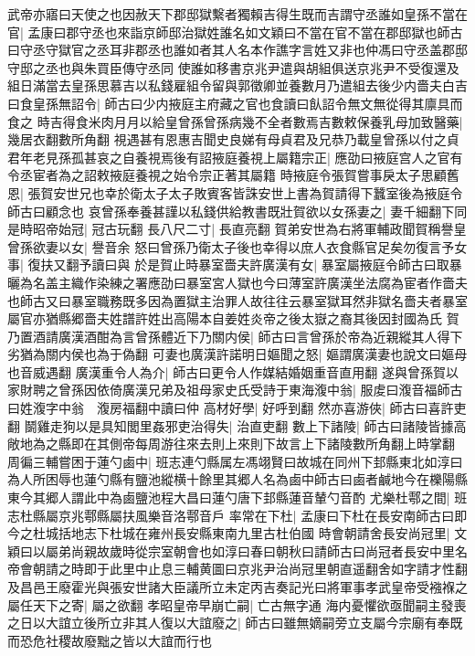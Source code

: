 武帝亦寤曰天使之也因赦天下郡邸獄繫者獨賴吉得生既而吉謂守丞誰如皇孫不當在官|{
	孟康曰郡守丞也來詣京師邸治獄姓誰名如文穎曰不當在官不當在郡邸獄也師古曰守丞守獄官之丞耳非郡丞也誰如者其人名本作譙字言姓又非也仲馮曰守丞盖郡邸守邸之丞也與朱買臣傳守丞同}
使誰如移書京兆尹遣與胡組俱送京兆尹不受復還及組日滿當去皇孫思慕吉以私錢雇組令留與郭徵卿並養數月乃遣組去後少内嗇夫白吉曰食皇孫無詔令|{
	師古曰少内掖庭主府藏之官也食讀曰飤詔令無文無從得其廪具而食之}
時吉得食米肉月月以給皇曾孫曾孫病幾不全者數焉吉數敕保養乳母加致醫藥|{
	幾居衣翻數所角翻}
視遇甚有恩惠吉聞史良娣有母貞君及兄恭乃載皇曾孫以付之貞君年老見孫孤甚哀之自養視焉後有詔掖庭養視上屬籍宗正|{
	應劭曰掖庭宫人之官有令丞宦者為之詔敕掖庭養視之始令宗正著其屬籍}
時掖庭令張賀嘗事戾太子思顧舊恩|{
	張賀安世兄也幸於衛太子太子敗賓客皆誅安世上書為賀請得下蠶室後為掖庭令師古曰顧念也}
哀曾孫奉養甚謹以私錢供給教書既壯賀欲以女孫妻之|{
	妻千細翻下同}
是時昭帝始冠|{
	冠古玩翻}
長八尺二寸|{
	長直亮翻}
賀弟安世為右將軍輔政聞賀稱譽皇曾孫欲妻以女|{
	譽音余}
怒曰曾孫乃衛太子後也幸得以庶人衣食縣官足矣勿復言予女事|{
	復扶又翻予讀曰與}
於是賀止時暴室嗇夫許廣漢有女|{
	暴室屬掖庭令師古曰取暴曬為名盖主織作染練之署應劭曰暴室宮人獄也今曰薄室許廣漢坐法腐為宦者作嗇夫也師古又曰暴室職務既多因為置獄主治罪人故往往云暴室獄耳然非獄名嗇夫者暴室屬官亦猶縣郷嗇夫姓譜許姓出高陽本自姜姓炎帝之後太嶽之裔其後因封國為氏}
賀乃置酒請廣漢酒酣為言曾孫體近下乃關内侯|{
	師古曰言曾孫於帝為近親縱其人得下劣猶為關内侯也為于偽翻}
可妻也廣漢許諾明日嫗聞之怒|{
	嫗謂廣漢妻也說文曰嫗母也音威遇翻}
廣漢重令人為介|{
	師古曰更令人作媒結婚姻重音直用翻}
遂與曾孫賀以家財聘之曾孫因依倚廣漢兄弟及祖母家史氏受詩于東海澓中翁|{
	服䖍曰澓音福師古曰姓澓字中翁　澓房福翻中讀曰仲}
高材好學|{
	好呼到翻}
然亦喜游俠|{
	師古曰喜許吏翻}
鬬雞走狗以是具知閭里姦邪吏治得失|{
	治直吏翻}
數上下諸陵|{
	師古曰諸陵皆據高敞地為之縣即在其側帝每周游往來去則上來則下故言上下諸陵數所角翻上時掌翻}
周徧三輔嘗困于蓮勺鹵中|{
	班志連勺縣属左馮翊賢曰故城在同州下邽縣東北如淳曰為人所困辱也蓮勺縣有鹽池縱横十餘里其郷人名為鹵中師古曰鹵者鹹地今在櫟陽縣東今其郷人謂此中為鹵鹽池程大昌曰蓮勺唐下邽縣蓮音輦勺音酌}
尤樂杜鄠之間|{
	班志杜縣屬京兆鄠縣屬扶風樂音洛鄠音戶}
率常在下杜|{
	孟康曰下杜在長安南師古曰即今之杜城括地志下杜城在雍州長安縣東南九里古杜伯國}
時會朝請舍長安尚冠里|{
	文穎曰以屬弟尚親故歲時從宗室朝會也如淳曰春曰朝秋曰請師古曰尚冠者長安中里名帝會朝請之時即于此里中止息三輔黄圖曰京兆尹治尚冠里朝直遥翻舍如字請才性翻}
及昌邑王廢霍光與張安世諸大臣議所立未定丙吉奏記光曰將軍事孝武皇帝受襁褓之屬任天下之寄|{
	屬之欲翻}
孝昭皇帝早崩亡嗣|{
	亡古無字通}
海内憂懼欲亟聞嗣主發喪之日以大誼立後所立非其人復以大誼廢之|{
	師古曰雖無嫡嗣旁立支屬今宗廟有奉既而恐危社稷故廢黜之皆以大誼而行也}
